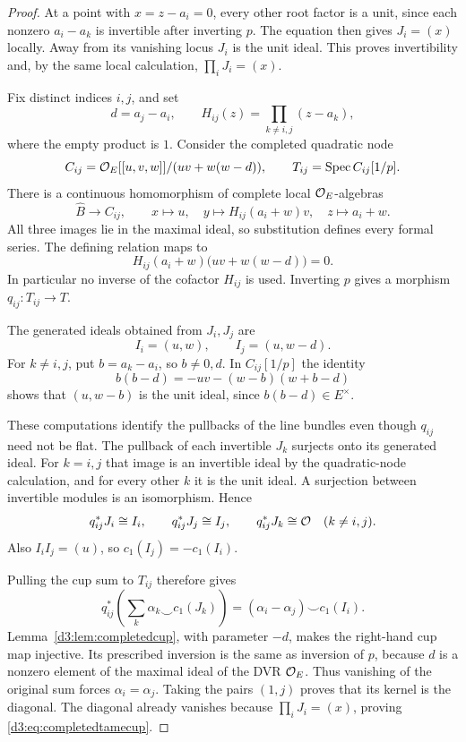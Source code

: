 \begin{proof}
At a point with $x=z-a_i=0$, every other root factor is a unit, since each nonzero $a_i-a_k$ is invertible after inverting $p$. The equation then gives $J_i=(x)$ locally. Away from its vanishing locus $J_i$ is the unit ideal. This proves invertibility and, by the same local calculation, $\prod_iJ_i=(x)$.

Fix distinct indices $i,j$, and set
\[
d=a_j-a_i,\qquad H_{ij}(z)=\prod_{k\ne i,j}(z-a_k),
\]
where the empty product is $1$. Consider the completed quadratic node
\[
C_{ij}=\mathcal O_E[[u,v,w]]/(uv+w(w-d)),\qquad
T_{ij}=\operatorname{Spec} C_{ij}[1/p].
\]
There is a continuous homomorphism of complete local $\mathcal O_E$-algebras
\begin{equation}\label{d3:eq:pairwiseformalmap}
\widehat B\longrightarrow C_{ij},\qquad
x\longmapsto u,\quad
y\longmapsto H_{ij}(a_i+w)v,\quad
z\longmapsto a_i+w.
\end{equation}
All three images lie in the maximal ideal, so substitution defines every formal series. The defining relation maps to
\[
H_{ij}(a_i+w)\bigl(uv+w(w-d)\bigr)=0.
\]
In particular no inverse of the cofactor $H_{ij}$ is used. Inverting $p$ gives a morphism $q_{ij}:T_{ij}\to T$.

The generated ideals obtained from $J_i,J_j$ are
\[
I_i=(u,w),\qquad I_j=(u,w-d).
\]
For $k\ne i,j$, put $b=a_k-a_i$, so $b\ne0,d$. In $C_{ij}[1/p]$ the identity
\[
b(b-d)=-uv-(w-b)(w+b-d)
\]
shows that $(u,w-b)$ is the unit ideal, since $b(b-d)\in E^\times$.

These computations identify the pullbacks of the line bundles even though $q_{ij}$ need not be flat. The pullback of each invertible $J_k$ surjects onto its generated ideal. For $k=i,j$ that image is an invertible ideal by the quadratic-node calculation, and for every other $k$ it is the unit ideal. A surjection between invertible modules is an isomorphism. Hence
\[
q_{ij}^*J_i\cong I_i,\qquad
q_{ij}^*J_j\cong I_j,\qquad
q_{ij}^*J_k\cong\mathcal O\quad(k\ne i,j).
\]
Also $I_iI_j=(u)$, so $c_1(I_j)=-c_1(I_i)$.

Pulling the cup sum to $T_{ij}$ therefore gives
\[
q_{ij}^*\left(\sum_k\alpha_k\smile c_1(J_k)\right)
=(\alpha_i-\alpha_j)\smile c_1(I_i).
\]
Lemma~\ref{d3:lem:completedcup}, with parameter $-d$, makes the right-hand cup map injective. Its prescribed inversion is the same as inversion of $p$, because $d$ is a nonzero element of the maximal ideal of the DVR $\mathcal O_E$. Thus vanishing of the original sum forces $\alpha_i=\alpha_j$. Taking the pairs $(1,j)$ proves that its kernel is the diagonal. The diagonal already vanishes because $\prod_iJ_i=(x)$, proving \eqref{d3:eq:completedtamecup}.
\end{proof}

